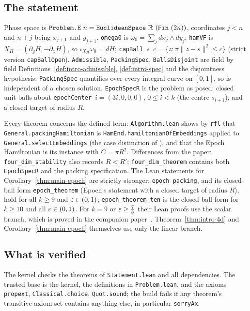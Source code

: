 \subsection*{The statement}

Phase space is $\texttt{Problem.E}~n=\texttt{EuclideanSpace}\ \R\ (\texttt{Fin}\ (2n))$, coordinates $j<n$ and $n+j$ being $x_{j+1}$ and $y_{j+1}$. \texttt{omega0} is $\omega_0=\sum_jdx_j\wedge dy_j$; \texttt{hamVF} is $X_H=(\partial_yH,-\partial_xH)$, so $\iota_{X_H}\omega_0=dH$; \texttt{capBall}~$s$~$c=\{z:\pi\|z-s\|^2\le c\}$ (strict version \texttt{capBallOpen}). \texttt{Admissible}, \texttt{PackingSpec}, \texttt{BallsDisjoint} are field by field Definitions~\ref{def:intro-admissible}, \ref{def:intro-spec} and the disjointness hypothesis; \texttt{PackingSpec} quantifies over every integral curve on $[0,1]$, so is independent of a chosen solution. \texttt{EpochSpecR} is the problem as posed: closed unit balls about \texttt{epochCenter}~$i=(3i,0,0,0)$, $0\le i<k$ (the centre $s_{i+1}$), and a closed target of radius $R$.

Every theorem concerns the defined term: \texttt{Algorithm.lean} shows by \texttt{rfl} that \texttt{General.packingHamiltonian} is \texttt{HamEnd.hamiltonianOfEmbeddings} applied to \texttt{General.selectEmbeddings} (the case distinction of ), and that the Epoch Hamiltonian is its instance with $C=\pi R^2$. Differences from the paper: \texttt{four\_dim\_stability} also records $R<R'$; \texttt{four\_dim\_theorem} contains both \texttt{EpochSpecR} and the packing specification. The Lean statements for Corollary~\ref{thm:main-epoch} are strictly stronger: \texttt{epoch\_packing}, and its closed-ball form \texttt{epoch\_theorem} (Epoch's statement with a closed target of radius $R$), hold for all $k\ge9$ and $\varepsilon\in(0,1)$; \texttt{epoch\_theorem\_ten} is the closed-ball form for $k\ge10$ and all $\varepsilon\in(0,1)$. For $k=9$ or $\varepsilon\ge\frac78$ their Lean proofs use the scalar branch, which is proved in the companion paper~\cite{SongHD}. Theorem~\ref{thm:intro-4d} and Corollary~\ref{thm:main-epoch} themselves use only the linear branch.

\subsection*{What is verified}

The kernel checks the theorems of \texttt{Statement.lean} and all dependencies. The trusted base is the kernel, the definitions in \texttt{Problem.lean}, and the axioms \texttt{propext}, \texttt{Classical.choice}, \texttt{Quot.sound}; the build fails if any theorem's transitive axiom set contains anything else, in particular \texttt{sorryAx}.

